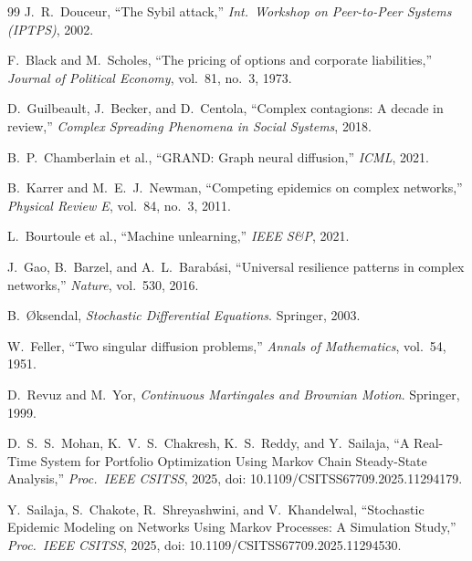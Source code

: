 \documentclass[conference]{IEEEtran}
\begin{document}
\begin{thebibliography}{99}
J.~R.~Douceur,
``The Sybil attack,''
\textit{Int.\ Workshop on Peer-to-Peer Systems (IPTPS)}, 2002.

F.~Black and M.~Scholes,
``The pricing of options and corporate liabilities,''
\textit{Journal of Political Economy}, vol.~81, no.~3, 1973.

D.~Guilbeault, J.~Becker, and D.~Centola,
``Complex contagions: A decade in review,''
\textit{Complex Spreading Phenomena in Social Systems}, 2018.

B.~P.~Chamberlain et al.,
``GRAND: Graph neural diffusion,''
\textit{ICML}, 2021.

B.~Karrer and M.~E.~J.~Newman,
``Competing epidemics on complex networks,''
\textit{Physical Review E}, vol.~84, no.~3, 2011.

L.~Bourtoule et al.,
``Machine unlearning,''
\textit{IEEE S\&P}, 2021.

J.~Gao, B.~Barzel, and A.~L.~Barab\'{a}si,
``Universal resilience patterns in complex networks,''
\textit{Nature}, vol.~530, 2016.

B.~{\O}ksendal,
\textit{Stochastic Differential Equations}.
Springer, 2003.

W.~Feller,
``Two singular diffusion problems,''
\textit{Annals of Mathematics}, vol.~54, 1951.

D.~Revuz and M.~Yor,
\textit{Continuous Martingales and Brownian Motion}.
Springer, 1999.

D.~S.~S.~Mohan, K.~V.~S.~Chakresh, K.~S.~Reddy, and Y.~Sailaja,
``A Real-Time System for Portfolio Optimization Using Markov
Chain Steady-State Analysis,''
\textit{Proc.\ IEEE CSITSS}, 2025,
doi: 10.1109/CSITSS67709.2025.11294179.

Y.~Sailaja, S.~Chakote, R.~Shreyashwini, and V.~Khandelwal,
``Stochastic Epidemic Modeling on Networks Using Markov
Processes: A Simulation Study,''
\textit{Proc.\ IEEE CSITSS}, 2025,
doi: 10.1109/CSITSS67709.2025.11294530.

\end{thebibliography}
\end{document}
